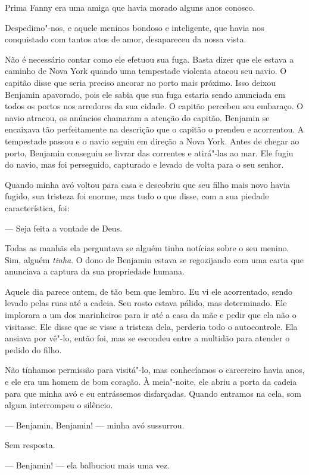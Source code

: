 Prima Fanny era uma amiga que havia
morado alguns anos conosco.

Despedimo"-nos, e aquele meninos bondoso e inteligente, que havia nos
conquistado com tantos atos de amor, desapareceu da nossa vista.

Não é necessário contar como ele
efetuou sua fuga. Basta dizer que ele estava a caminho de Nova York
quando uma tempestade violenta atacou seu navio. O capitão disse que
seria preciso ancorar no porto mais próximo. Isso deixou Benjamin
apavorado, pois ele sabia que sua fuga estaria sendo anunciada em todos
os portos nos arredores da sua cidade. O capitão percebeu seu embaraço.
O navio atracou, os anúncios chamaram a atenção do capitão. Benjamin se
encaixava tão perfeitamente na descrição que o capitão o prendeu e
acorrentou. A tempestade passou e o navio seguiu em direção a Nova York.
Antes de chegar ao porto, Benjamin conseguiu se livrar das correntes e
atirá"-las ao mar. Ele fugiu do navio, mas foi perseguido, capturado e
levado de volta para o seu senhor.

Quando minha avó voltou para casa e
descobriu que seu filho mais novo havia fugido, sua tristeza foi enorme,
mas tudo o que disse, com a sua piedade característica, foi:

--- Seja feita a vontade de Deus.

Todas as manhãs ela perguntava se alguém tinha notícias sobre o seu
menino. Sim, alguém \emph{tinha}. O dono de Benjamin estava se
regozijando com uma carta que anunciava a captura da sua propriedade
humana.

Aquele dia parece ontem, de tão bem que
lembro. Eu vi ele acorrentado, sendo levado pelas ruas até a cadeia. Seu
rosto estava pálido, mas determinado. Ele implorara a um dos marinheiros
para ir até a casa da mãe e pedir que ela não o visitasse. Ele disse que
se visse a tristeza dela, perderia todo o autocontrole. Ela ansiava por
vê"-lo, então foi, mas se escondeu entre a multidão para atender o pedido
do filho.

Não tínhamos permissão para visitá"-lo,
mas conhecíamos o carcereiro havia anos, e ele era um homem de bom
coração. À meia"-noite, ele abriu a porta da cadeia para que minha avó e
eu entrássemos disfarçadas. Quando entramos na cela, som algum
interrompeu o silêncio.

--- Benjamin, Benjamin! --- minha avó sussurrou.

Sem resposta.

--- Benjamin! --- ela balbuciou mais uma vez.

